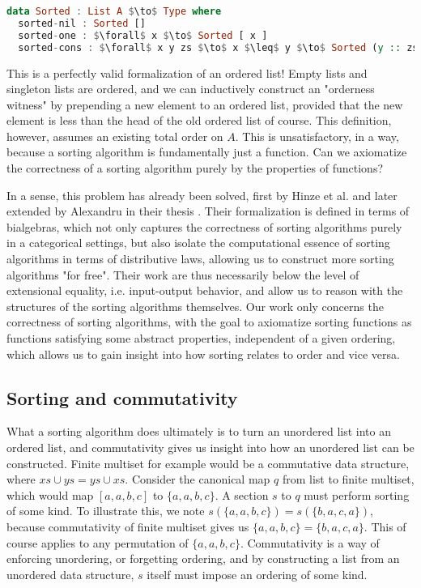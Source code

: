 \begin{lstlisting}[language=Haskell]
data Sorted : List A $\to$ Type where
  sorted-nil : Sorted []
  sorted-one : $\forall$ x $\to$ Sorted [ x ]
  sorted-cons : $\forall$ x y zs $\to$ x $\leq$ y $\to$ Sorted (y :: zs) $\to$ Sorted (x :: y :: zs)
\end{lstlisting}

This is a perfectly valid formalization of an ordered list! Empty lists and singleton lists
are ordered, and we can inductively construct an "orderness witness" by prepending a new element
to an ordered list, provided that the new element is less than the head of the old ordered list of
course. This definition, however, assumes an existing total order on $A$. This is
unsatisfactory, in a way, because a sorting algorithm is fundamentally just a function. Can we
axiomatize the correctness of a sorting algorithm purely by the properties of functions?

In a sense, this problem has already been solved, first by Hinze et al. \cite{10.1145/2364394.2364405}
and later extended by Alexandru in their thesis \cite{alexandru_intrinsically_2023}.
Their formalization is defined in terms of bialgebras, which not
only captures the correctness of sorting algorithms purely in a categorical settings, but
also isolate the computational essence of sorting algorithms in terms of distributive laws,
allowing us to construct more sorting algorithms "for free". Their work are thus necessarily
below the level of extensional equality, i.e. input-output behavior, and allow us to reason
with the structures of the sorting algorithms themselves. Our work only concerns the correctness
of sorting algorithms, with the goal to axiomatize sorting functions as functions satisfying
some abstract properties, independent of a given ordering, which allows us to gain
insight into how sorting relates to order and vice versa.

\subsection*{Sorting and commutativity}
What a sorting algorithm does ultimately is to turn an unordered list into an ordered list,
and commutativity gives us insight into how an unordered list can be constructed.
Finite multiset for example would be a commutative data structure, where $xs \cup ys = ys \cup xs$.
Consider the canonical map $q$ from list to finite multiset, which would map
$[a, a, b, c]$ to $\{a, a, b, c\}$. A section $s$ to $q$ must perform sorting of some kind.
To illustrate this, we note $s(\{a, a, b, c\}) = s(\{b, a, c, a\})$, because commutativity
of finite multiset gives us $\{a, a, b, c\} = \{b, a, c, a\}$. This of course applies to
any permutation of $\{a, a, b, c\}$. Commutativity is a way of enforcing unordering,
or forgetting ordering, and by constructing a list from an unordered data structure, $s$ itself
must impose an ordering of some kind.

